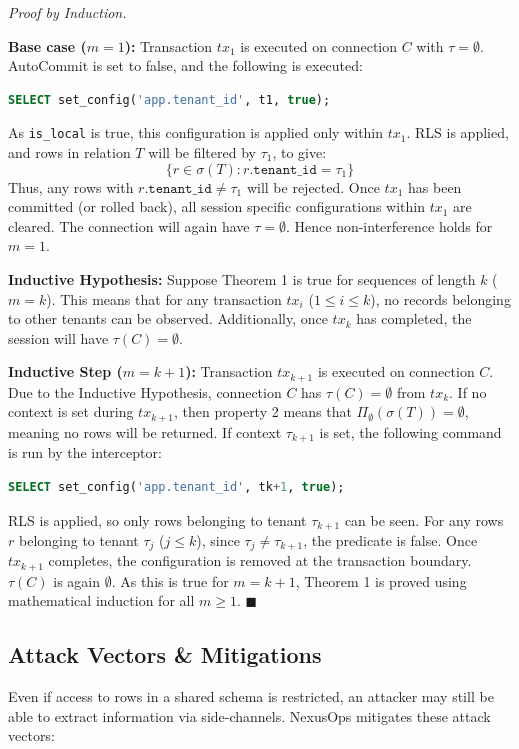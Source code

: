 \documentclass[conference]{IEEEtran}
\begin{document}
\noindent \textit{Proof by Induction.}

\textbf{Base case ($m = 1$):} Transaction $tx_1$ is executed on connection $C$ with $\tau = \emptyset$. AutoCommit is set to false, and the following is executed:
\begin{lstlisting}[language=SQL]
SELECT set_config('app.tenant_id', t1, true);
\end{lstlisting}
As \texttt{is\_local} is true, this configuration is applied only within $tx_1$. RLS is applied, and rows in relation $T$ will be filtered by $\tau_1$, to give:
\begin{equation}
\{r \in \sigma(T) : r.\texttt{tenant\_id} = \tau_1\}
\end{equation}
Thus, any rows with $r.\texttt{tenant\_id} \neq \tau_1$ will be rejected. Once $tx_1$ has been committed (or rolled back), all session specific configurations within $tx_1$ are cleared. The connection will again have $\tau = \emptyset$. Hence non-interference holds for $m = 1$.

\textbf{Inductive Hypothesis:} Suppose Theorem 1 is true for sequences of length $k$ ($m = k$). This means that for any transaction $tx_i$ ($1 \le i \le k$), no records belonging to other tenants can be observed. Additionally, once $tx_k$ has completed, the session will have $\tau(C) = \emptyset$.

\textbf{Inductive Step ($m = k + 1$):} Transaction $tx_{k+1}$ is executed on connection $C$. Due to the Inductive Hypothesis, connection $C$ has $\tau(C) = \emptyset$ from $tx_k$. If no context is set during $tx_{k+1}$, then property 2 means that $\Pi_\emptyset (\sigma(T)) = \emptyset$, meaning no rows will be returned. If context $\tau_{k+1}$ is set, the following command is run by the interceptor:
\begin{lstlisting}[language=SQL]
SELECT set_config('app.tenant_id', tk+1, true);
\end{lstlisting}
RLS is applied, so only rows belonging to tenant $\tau_{k+1}$ can be seen. For any rows $r$ belonging to tenant $\tau_j$ ($j \le k$), since $\tau_j \neq \tau_{k+1}$, the predicate is false. Once $tx_{k+1}$ completes, the configuration is removed at the transaction boundary. $\tau(C)$ is again $\emptyset$. As this is true for $m = k+1$, Theorem 1 is proved using mathematical induction for all $m \ge 1$. $\blacksquare$

\subsection{Attack Vectors \& Mitigations}
Even if access to rows in a shared schema is restricted, an attacker may still be able to extract information via side-channels. NexusOps mitigates these attack vectors:
\end{document}
